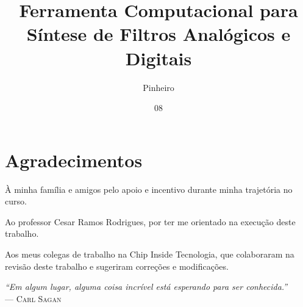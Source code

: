 \documentclass[tcc]{mdtufsm}
\title{Ferramenta Computacional para Síntese de Filtros Analógicos e Digitais}
\author{Pinheiro}{Renan Birck}
\institute{Centro de Tecnologia}
\date{08}{julho}{2015}
\begin{document}
\maketitle



\makeapprove


\chapter*{Agradecimentos}
À minha família e amigos pelo apoio e incentivo durante minha trajetória no curso.

Ao professor Cesar Ramos Rodrigues, por ter me orientado na execução deste trabalho. 

Aos meus colegas de trabalho na Chip Inside Tecnologia, que colaboraram na revisão deste trabalho e sugeriram correções e modificações. 

\clearpage
\begin{flushright}
\mbox{}\vfill
{\sffamily\itshape
``Em algum lugar, alguma coisa incrível está esperando para ser conhecida.'' \\ }
--- \textsc{Carl Sagan}
\end{flushright}
\end{document}
